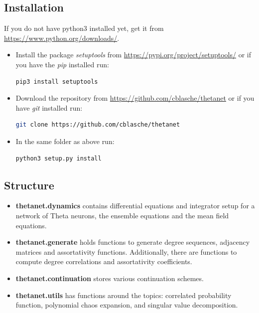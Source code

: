 \documentclass[bibliography=totoc, twoside]{article}
\numberwithin{equation}{section}
\begin{document}
\subsection*{Installation}
If you do not have python3 installed yet, get it from \url{https://www.python.org/downloads/}.
\begin{itemize}
    \item Install the package \textit{setuptools} from \url{https://pypi.org/project/setuptools/} or if you have the \textit{pip} installed run:
\begin{lstlisting}[language=Bash]
pip3 install setuptools
\end{lstlisting}
    \item Download the repository from \url{https://github.com/cblasche/thetanet} or if you have \textit{git} installed run:
\begin{lstlisting}[language=Bash]
git clone https://github.com/cblasche/thetanet
\end{lstlisting}
    \item In the same folder as above run:
\begin{lstlisting}[language=Bash]
python3 setup.py install
\end{lstlisting}
\end{itemize}


\subsection*{Structure}
\begin{itemize}
    \item \textbf{thetanet.dynamics} contains differential equations and integrator setup for a network of Theta neurons, the ensemble equations and the mean field equations.
    \item \textbf{thetanet.generate} holds functions to generate degree sequences, adjacency matrices and assortativity functions. Additionally, there are functions to compute degree correlations and assortativity coefficients.
    \item \textbf{thetanet.continuation} stores various continuation schemes.
    \item \textbf{thetanet.utils} has functions around the topics: correlated probability function, polynomial chaos expansion, and singular value decomposition.
\end{itemize}
\end{document}
